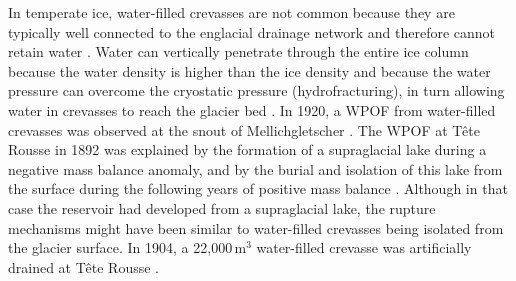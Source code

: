 In temperate ice, water-filled crevasses are not common because they are typically well connected to the englacial drainage network and therefore cannot retain water \citep{Fountain&Walder1998}. Water can vertically penetrate through the entire ice column \citep{Weertman1973,VanderVeen1998} because the water density is higher than the ice density and because the water pressure can overcome the cryostatic pressure (hydrofracturing), in turn allowing water in crevasses to reach the glacier bed \citep{VanderVeen2007,Benn&al2009}. In 1920, a WPOF from water-filled crevasses was observed at the snout of Mellichgletscher \citep{Mercanton1921}. The WPOF at Tête Rousse in 1892 was explained by the formation of a supraglacial lake during a negative mass balance anomaly, and by the burial and isolation of this lake from the surface during the following years of positive mass balance \citep{Vincent&al2010b}. Although in that case the reservoir had developed from a supraglacial lake, the rupture mechanisms might have been similar to water-filled crevasses being isolated from the glacier surface. In 1904, a 22,000\,m$^3$ water-filled crevasse was artificially drained at Tête Rousse \citep{Vincent&al2010b}.

